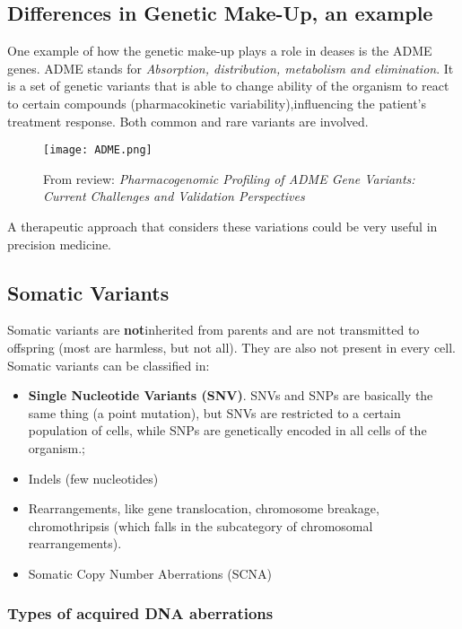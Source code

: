 \subsection{Differences in Genetic Make-Up, an example}
One example of how the genetic make-up plays a role in deases is the ADME genes.
ADME stands for \textit{Absorption, distribution, metabolism and elimination}.
It is a set of genetic variants that is able to change ability of the organism to react to certain compounds (pharmacokinetic variability),influencing the patient's treatment response. Both common and rare variants are involved.
\begin{figure}[H]
    \texttt{[image: ADME.png]}
    \caption{From review: \textit{Pharmacogenomic Profiling of ADME Gene Variants:
Current Challenges and Validation Perspectives}}
\end{figure}

A therapeutic approach that considers these variations could be very useful in precision medicine.

\subsection{Somatic Variants}
Somatic variants are \textbf{not}inherited from parents and are not transmitted to offspring (most are harmless, but not all). They are also not present in every cell.\\
Somatic variants can be classified in:

\begin{itemize}
\item \textbf{Single Nucleotide Variants (SNV)}. SNVs and SNPs are basically the same thing (a point mutation), but SNVs are restricted to a certain population of cells, while SNPs are genetically encoded in all cells of the organism.;
\item Indels (few nucleotides)
\item Rearrangements, like gene translocation, chromosome breakage, chromothripsis (which falls in the subcategory of chromosomal rearrangements).
\item Somatic Copy Number Aberrations (SCNA)
\end{itemize}


		\subsubsection{Types of acquired DNA aberrations} \label{subsec:aberrations}



